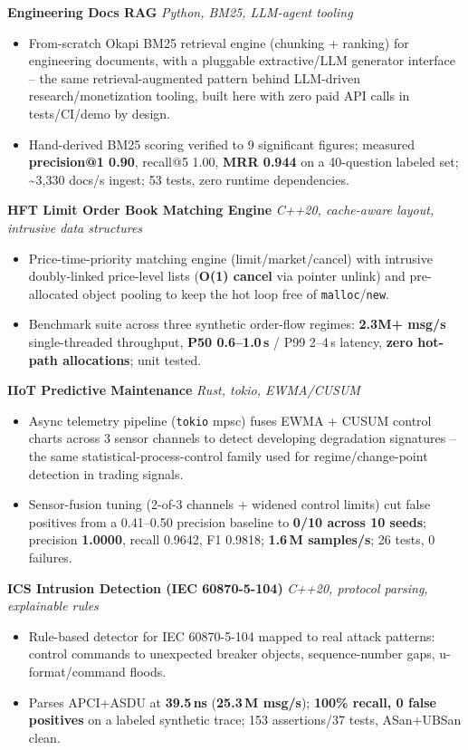 \documentclass[10pt]{article}
\newcommand{\projectentry}[2]{%
  \noindent\textbf{#1} \hfill \textit{#2}\\[-0.3em]
}
\begin{document}
\projectentry{Engineering Docs RAG}{Python, BM25, LLM-agent tooling}
\begin{itemize}
  \item From-scratch Okapi BM25 retrieval engine (chunking + ranking) for engineering documents, with a pluggable extractive/LLM generator interface -- the same retrieval-augmented pattern behind LLM-driven research/monetization tooling, built here with zero paid API calls in tests/CI/demo by design.
  \item Hand-derived BM25 scoring verified to 9 significant figures; measured \textbf{precision@1 0.90}, recall@5 1.00, \textbf{MRR 0.944} on a 40-question labeled set; \textasciitilde3{,}330 docs/s ingest; 53 tests, zero runtime dependencies.
\end{itemize}

\projectentry{HFT Limit Order Book Matching Engine}{C++20, cache-aware layout, intrusive data structures}
\begin{itemize}
  \item Price-time-priority matching engine (limit/market/cancel) with intrusive doubly-linked price-level lists (\textbf{O(1) cancel} via pointer unlink) and pre-allocated object pooling to keep the hot loop free of \texttt{malloc}/\texttt{new}.
  \item Benchmark suite across three synthetic order-flow regimes: \textbf{2.3M+ msg/s} single-threaded throughput, \textbf{P50 0.6--1.0\,\textmu s} / P99 2--4\,\textmu s latency, \textbf{zero hot-path allocations}; unit tested.
\end{itemize}

\projectentry{IIoT Predictive Maintenance}{Rust, tokio, EWMA/CUSUM}
\begin{itemize}
  \item Async telemetry pipeline (\texttt{tokio} mpsc) fuses EWMA + CUSUM control charts across 3 sensor channels to detect developing degradation signatures -- the same statistical-process-control family used for regime/change-point detection in trading signals.
  \item Sensor-fusion tuning (2-of-3 channels + widened control limits) cut false positives from a 0.41--0.50 precision baseline to \textbf{0/10 across 10 seeds}; precision \textbf{1.0000}, recall 0.9642, F1 0.9818; \textbf{1.6\,M samples/s}; 26 tests, 0 failures.
\end{itemize}

\projectentry{ICS Intrusion Detection (IEC 60870-5-104)}{C++20, protocol parsing, explainable rules}
\begin{itemize}
  \item Rule-based detector for IEC 60870-5-104 mapped to real attack patterns: control commands to unexpected breaker objects, sequence-number gaps, u-format/command floods.
  \item Parses APCI+ASDU at \textbf{39.5\,ns} (\textbf{25.3\,M msg/s}); \textbf{100\% recall, 0 false positives} on a labeled synthetic trace; 153 assertions/37 tests, ASan+UBSan clean.
\end{itemize}
\end{document}
